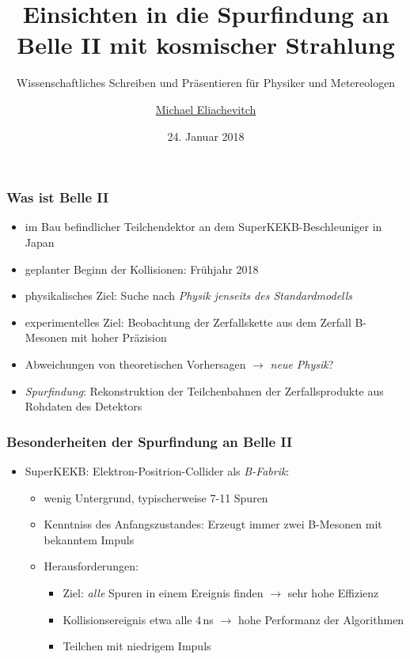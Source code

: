 \documentclass[18pt]{beamer}
\title{Einsichten in die Spurfindung an Belle II mit kosmischer Strahlung}
\subtitle{Wissenschaftliches Schreiben und Präsentieren für Physiker und Metereologen}
\author{\underline{Michael Eliachevitch}}
\date{24. Januar 2018}
\institute{}
\begin{document}

\begin{frame}
  \titlepage
\end{frame}

\begin{frame}
  \frametitle{Was ist Belle II}
  \begin{itemize}
    \item im Bau befindlicher Teilchendektor an dem SuperKEKB-Beschleuniger in Japan
    \item geplanter Beginn der Kollisionen: Frühjahr 2018
    \item physikalisches Ziel: Suche nach \emph{Physik jenseits des Standardmodells}
    \item experimentelles Ziel: Beobachtung der Zerfallskette aus dem Zerfall B-Mesonen mit hoher Präzision
    \item Abweichungen von theoretischen Vorhersagen $\rightarrow$ \emph{neue Physik}?
    \item \emph{Spurfindung}: Rekonstruktion der Teilchenbahnen der Zerfallsprodukte aus Rohdaten des Detektors
    \end{itemize}

    
    
\end{frame}

\begin{frame}
  \frametitle{Besonderheiten der Spurfindung an Belle II}
  \begin{itemize}
  \item SuperKEKB: Elektron-Positrion-Collider als \emph{B-Fabrik}:
    \begin{itemize}
    \item wenig Untergrund, typischerweise 7-11 Spuren 
    \item Kenntniss des Anfangszustandes: Erzeugt immer zwei B-Mesonen mit bekanntem Impuls
    \end{itemize}
    \begin{itemize}
    \item Herausforderungen:
      \begin{itemize}
      \item Ziel: \emph{alle} Spuren in einem Ereignis finden $\rightarrow$ sehr hohe Effizienz
      \item Kollisionsereignis etwa alle 4\,ns $\rightarrow$ hohe Performanz der Algorithmen
      \item Teilchen mit niedrigem Impuls
      \end{itemize}
    \end{itemize}
  \end{itemize}
  
\end{frame}
\end{document}
